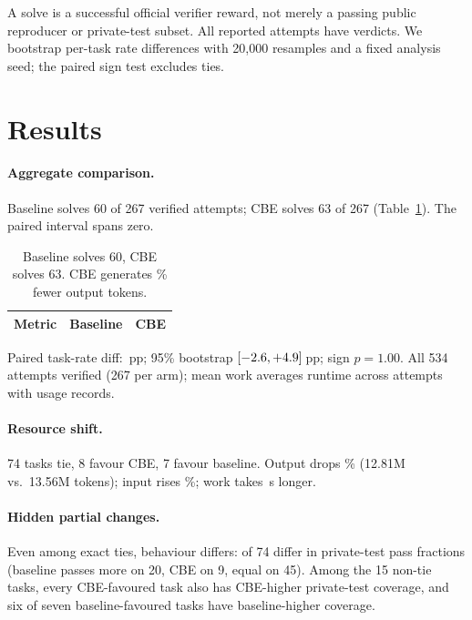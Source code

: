 \documentclass[11pt,a4paper,twocolumn]{article}
\newcommand{\smalltable}{\fontsize{8.7}{10.7}\selectfont\setlength{\tabcolsep}{3pt}\renewcommand{\arraystretch}{1.12}}
\begin{document}
A solve is a successful official verifier reward, not merely a passing public reproducer or private-test subset. All reported attempts have verdicts. We bootstrap per-task rate differences with 20,000 resamples and a fixed analysis seed; the paired sign test excludes ties.

\section{Results}
\label{sec:results}

\paragraph{Aggregate comparison.}
Baseline solves 60 of 267 verified attempts; CBE solves 63 of 267 (Table~\ref{tab:main}). The paired interval spans zero.

\begin{table}[t]
\caption{Baseline solves 60, CBE solves 63. CBE generates \OutputReduction\% fewer output tokens.}
\label{tab:main}
\smalltable
\begin{tabular*}{\columnwidth}{@{\extracolsep{\fill}}lrr@{}}
\toprule
Metric & Baseline & CBE \\
\midrule

\end{tabular*}
\vspace{3pt}
{\fontsize{8.2}{9.8}\selectfont
Paired task-rate diff: \TaskDelta{}\,pp; 95\% bootstrap $[-2.6,+4.9]$\,pp; sign $p=1.00$. All 534 attempts verified (267 per arm); mean work averages runtime across attempts with usage records.}
\end{table}

\paragraph{Resource shift.}
74 tasks tie, 8 favour CBE, 7 favour baseline. Output drops \OutputReduction\% (12.81M vs.\ 13.56M tokens); input rises \InputIncrease\%; work takes \WorkIncrease\,s longer.

\paragraph{Hidden partial changes.}
Even among exact ties, behaviour differs: \HiddenPrivateDifferences{} of 74 differ in private-test pass fractions (baseline passes more on 20, CBE on 9, equal on 45). Among the 15 non-tie tasks, every CBE-favoured task also has CBE-higher private-test coverage, and six of seven baseline-favoured tasks have baseline-higher coverage.
\end{document}
